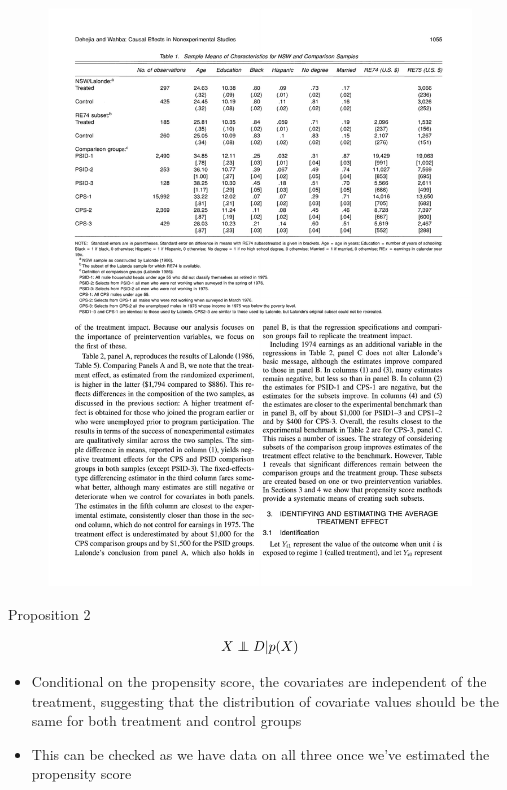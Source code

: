 \documentclass{beamer}
\newcommand\independent{\protect\mathpalette{\protect\independenT}{\perp}}
\def\independenT#1#2{\mathrel{\rlap{$#1#2$}\mkern2mu{#1#2}}}
\begin{document}
\begin{frame}[plain]
	
\begin{figure}
\includegraphics[scale=0.5]{./lecture_includes/dw_1.pdf}
\end{figure}

\end{frame}


\begin{frame}{Proposition 2}
	
	\begin{eqnarray*}
	X \independent D | p(X)
	\end{eqnarray*}
	
	\begin{itemize}
	\item Conditional on the propensity score, the covariates are independent of the treatment, suggesting that the distribution of covariate values should be the same for both treatment and control groups
	\item This can be checked as we have data on all three once we've estimated the propensity score
	\end{itemize}

\end{frame}
\end{document}
